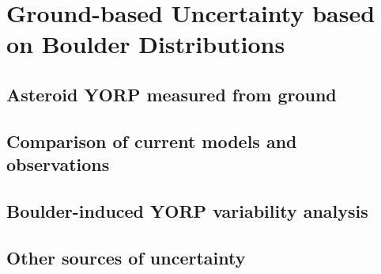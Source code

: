 \chapter{Ground-based Uncertainty based on Boulder Distributions}
\label{yorp_estimates}
                                                                                

\section{Asteroid YORP measured from ground}

\section{Comparison of current models and observations}

\section{Boulder-induced YORP variability analysis}

\section{Other sources of uncertainty}






